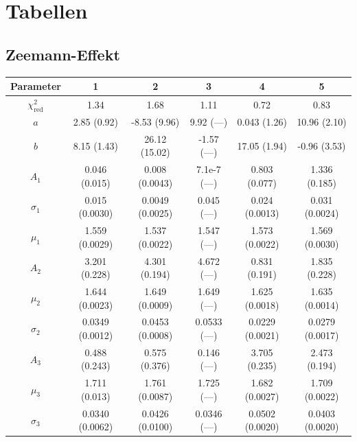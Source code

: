 \clearpage
\section{Tabellen}
\subsection{Zeemann-Effekt}
\begin{table}[ht]
    \centering
    \footnotesize
    \begin{tabular}{c *{5}{c}}
        \toprule
        Parameter & {1} & {2} & {3} & {4} & {5} \\
        \midrule
        $\chi_\text{red}^2$ & 1.34      & 1.68              & 1.11          & 0.72              & 0.83 \\
        $a$         & 2.85 (0.92)       & -8.53 (9.96)      & 9.92 (---)    & 0.043 (1.26)      & 10.96 (2.10) \\
        $b$         & 8.15 (1.43)       & 26.12 (15.02)     & -1.57 (---)   & 17.05 (1.94)      & -0.96 (3.53) \\
        $A_1$       & 0.046 (0.015)     & 0.008 (0.0043)    & 7.1e-7 (---)  & 0.803 (0.077)     & 1.336 (0.185) \\
        $\sigma_1$  & 0.015 (0.0030)    & 0.0049 (0.0025)   & 0.045 (---)   & 0.024 (0.0013)    & 0.031 (0.0024) \\
        $\mu_1$     & 1.559 (0.0029)    & 1.537 (0.0022)    & 1.547 (---)   & 1.573 (0.0022)    & 1.569 (0.0030) \\
        $A_2$       & 3.201 (0.228)     & 4.301 (0.194)     & 4.672 (---)   & 0.831 (0.191)     & 1.835 (0.228) \\
        $\mu_2$     & 1.644 (0.0023)    & 1.649 (0.0009)    & 1.649 (---)   & 1.625 (0.0018)    & 1.635 (0.0014) \\
        $\sigma_2$  & 0.0349 (0.0012)   & 0.0453 (0.0008)   & 0.0533 (---)  & 0.0229 (0.0021)   & 0.0279 (0.0017) \\
        $A_3$       & 0.488 (0.243)     & 0.575 (0.376)     & 0.146 (---)   & 3.705 (0.235)     & 2.473 (0.194) \\
        $\mu_3$     & 1.711 (0.013)     & 1.761 (0.0087)    & 1.725 (---)   & 1.682 (0.0027)    & 1.709 (0.0022) \\
        $\sigma_3$  & 0.0340 (0.0062)   & 0.0426 (0.0100)   & 0.0346 (---)  & 0.0502 (0.0020)   & 0.0403 (0.0020) \\
        \bottomrule
    \end{tabular}

\end{table}
